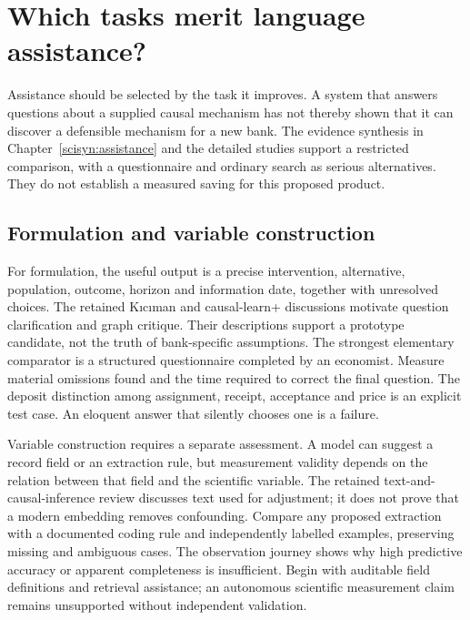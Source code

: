 \chapter{Which tasks merit language assistance?}
\label{rewrite:assistance-tasks}

Assistance should be selected by the task it improves. A system that answers
questions about a supplied causal mechanism has not thereby shown that
it can discover a defensible mechanism for a new bank. The evidence
synthesis in Chapter~\ref{scisyn:assistance} and the detailed studies
support a restricted comparison, with a questionnaire and ordinary search
as serious alternatives. They do not establish a measured saving for this
proposed product.

\section{Formulation and variable construction}
For formulation, the useful output is a precise intervention, alternative,
population, outcome, horizon and information date, together with unresolved
choices. The retained Kıcıman and causal-learn+ discussions motivate
question clarification and graph critique. Their descriptions support
a prototype candidate, not the truth of bank-specific assumptions.
\citep{v12_la_2305_00050,v12_la_2606_23608}
The strongest elementary comparator is a structured questionnaire completed
by an economist. Measure material omissions found and the time required
to correct the final question. The deposit distinction among assignment,
receipt, acceptance and price is an explicit test case. An eloquent
answer that silently chooses one is a failure.

Variable construction requires a separate assessment. A model can suggest
a record field or an extraction rule, but measurement validity depends
on the relation between that field and the scientific variable. The
retained text-and-causal-inference review discusses text used for adjustment;
it does not prove that a modern embedding removes confounding.
\citep{exec13_census_text_review_arxiv}
Compare any proposed extraction with a documented coding rule and
independently labelled examples, preserving missing and ambiguous cases.
The observation journey shows why high predictive accuracy or apparent
completeness is insufficient. Begin with auditable field definitions and
retrieval assistance; an autonomous scientific measurement claim remains
unsupported without independent validation.


